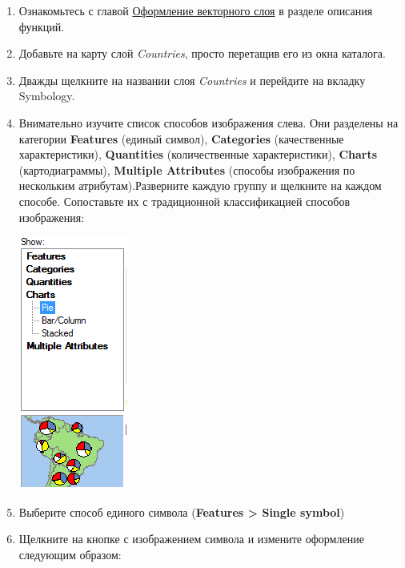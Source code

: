 \documentclass[]{book}
\theoremstyle{definition}
\theoremstyle{definition}
\theoremstyle{definition}
\theoremstyle{remark}
\begin{document}
\begin{enumerate}
\def\labelenumi{\arabic{enumi}.}
\item
  Ознакомьтесь с главой \protect\hyperlink{manual-vector}{Оформление
  векторного слоя} в разделе описания функций.
\item
  Добавьте на карту слой \emph{Countries}, просто перетащив его из окна
  каталога.
\item
  Дважды щелкните на названии слоя \emph{Countries} и перейдите на
  вкладку Symbology.
\item
  Внимательно изучите список способов изображения слева. Они разделены
  на категории \textbf{Features} (единый символ), \textbf{Categories}
  (качественные характеристики), \textbf{Quantities} (количественные
  характеристики), \textbf{Charts} (картодиаграммы), \textbf{Multiple
  Attributes} (способы изображения по нескольким атрибутам).Разверните
  каждую группу и щелкните на каждом способе. Сопоставьте их с
  традиционной классификацией способов изображения:

  \includegraphics{images/Ex03/image12.png}
\item
  Выберите способ единого символа (\textbf{Features \textgreater{}
  Single symbol})
\item
  Щелкните на кнопке с изображением символа и измените оформление
  следующим образом:


\end{enumerate}
\end{document}
